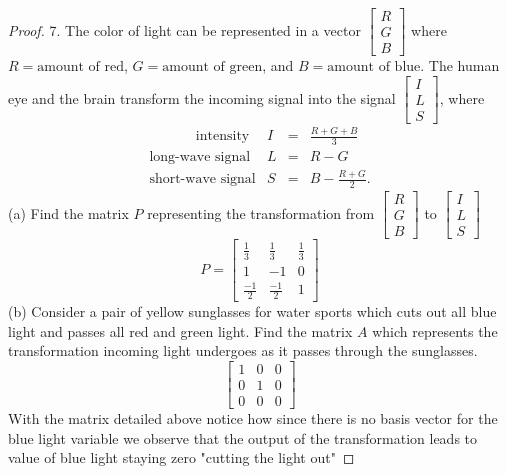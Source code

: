 \documentclass[12pt]{article}
\begin{document}
\begin{proof}
  7. The color of light can be represented in a vector $\begin{bmatrix} R \\ G \\ B \end{bmatrix}$ where $R = \text{amount of red}$,
  $G = \text{amount of green}$, and $B = \text{amount of blue}$. The human eye and the brain transform the incoming signal into the
  signal $\begin{bmatrix} I \\ L \\ S\end{bmatrix}$, where
  \[
  \begin{matrix}
  \text{~~~~~~~~~~intensity} & I & = & \frac{R+G+B}{3}\\
  \text{long-wave signal} & L & = & R - G \\
  \text{short-wave signal} & S & =& B - \frac{R+G}{2}.
  \end{matrix}
  \]
  \vskip 10pt
  \noindent
  (a) Find the matrix $P$ representing the transformation from  $\begin{bmatrix} R \\ G \\ B \end{bmatrix}$ to
  $\begin{bmatrix} I \\ L \\ S\end{bmatrix}$
  \vskip 5pt
  \[
  \renewcommand{\arraystretch}{2.5}
    P=\begin{bmatrix}
      \frac{1}{3}&  \frac{1}{3}&  \frac{1}{3}\\
      1&-1&0\\
      \frac{-1}{2}&\frac{-1}{2}&1
  \end{bmatrix}
  \]
  \noindent
  (b) Consider a pair of yellow sunglasses for water sports which cuts out all blue light and passes all red and green light. Find the
  matrix $A$ which represents the transformation incoming light undergoes as it passes through the sunglasses.
  \[
  \begin{bmatrix}
    1&0&0\\0&1&0\\0&0&0
  \end{bmatrix}
  \]
  With the matrix detailed above notice how since there is no basis vector for the blue light variable we observe that the output of the transformation leads to value of blue light staying zero "cutting the light out"

\end{proof}
\end{document}
